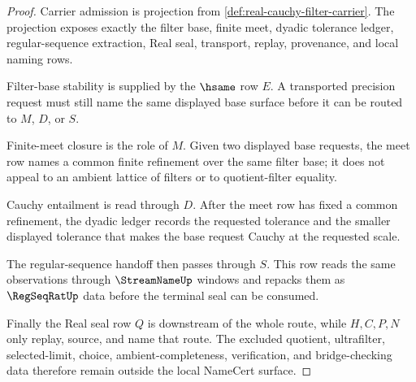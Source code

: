 \begin{proof}
Carrier admission is projection from \autoref{def:real-cauchy-filter-carrier}. The projection exposes exactly the filter base, finite meet, dyadic tolerance ledger, regular-sequence extraction, Real seal, transport, replay, provenance, and local naming rows.

Filter-base stability is supplied by the $\hsame$ row $E$. A transported precision request must still name the same displayed base surface before it can be routed to $M$, $D$, or $S$.

Finite-meet closure is the role of $M$. Given two displayed base requests, the meet row names a common finite refinement over the same filter base; it does not appeal to an ambient lattice of filters or to quotient-filter equality.

Cauchy entailment is read through $D$. After the meet row has fixed a common refinement, the dyadic ledger records the requested tolerance and the smaller displayed tolerance that makes the base request Cauchy at the requested scale.

The regular-sequence handoff then passes through $S$. This row reads the same observations through $\StreamNameUp$ windows and repacks them as $\RegSeqRatUp$ data before the terminal seal can be consumed.

Finally the Real seal row $Q$ is downstream of the whole route, while $H,C,P,N$ only replay, source, and name that route. The excluded quotient, ultrafilter, selected-limit, choice, ambient-completeness, verification, and bridge-checking data therefore remain outside the local NameCert surface.
\end{proof}

